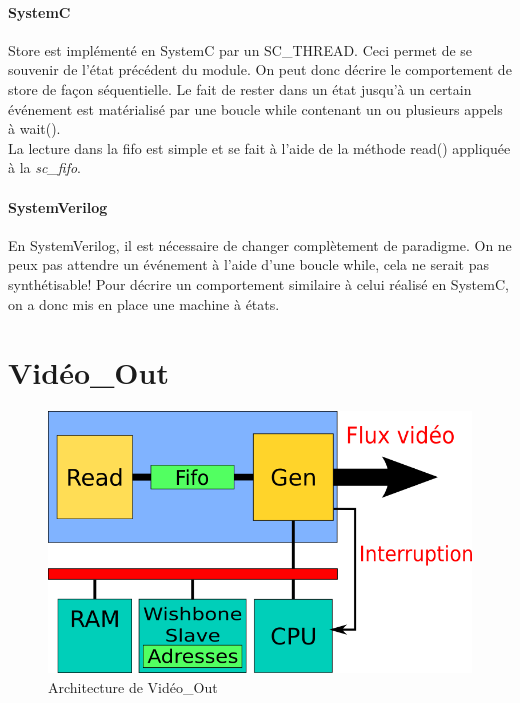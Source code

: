 \documentclass[a4paper,12pt]{report}
\begin{document}
{{			  \paragraph{SystemC}
	 Store est implémenté en SystemC par un SC\_THREAD.
		Ceci permet de se souvenir de l'état précédent du module.
		On peut donc décrire le comportement de store de façon séquentielle.
		Le fait de rester dans un état jusqu'à un certain événement est matérialisé par une boucle while contenant un ou plusieurs appels à wait(). \\
		La lecture dans la fifo est simple et se fait à l'aide de la méthode read() appliquée à la \emph{sc\_fifo}.

		\paragraph{SystemVerilog}
	 En SystemVerilog, il est nécessaire de changer complètement de paradigme.
		On ne peux pas attendre un événement à l'aide d'une boucle while,
			cela ne serait pas synthétisable!
			  Pour décrire un comportement similaire à celui réalisé en SystemC, on a donc mis en place une machine à états.




			  {}

	 \newpage

		\section{Vidéo\_Out}

	 \begin{figure}[!h]
		\centering
		\includegraphics[scale = 0.5]{video_out.png}
	 \caption{Architecture de Vidéo\_Out}
	 \end{figure}

}}
\end{document}
